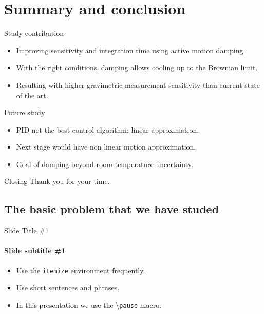 \documentclass{beamer}
\begin{document}
\section{Summary and conclusion}


\begin{frame}{Study contribution}
	\begin{itemize}
		\item Improving sensitivity and integration time using active motion damping.
		\item With the right conditions, damping allows cooling up to the Brownian limit. 
		\item Resulting with higher gravimetric measurement sensitivity than current state of the art.
		
	\end{itemize}
\end{frame}

\begin{frame}{Future study}
	\begin{itemize}
		
		\item PID not the best control algorithm; linear approximation. 
		\item Next stage would have non linear motion approximation.
		\item Goal of damping beyond room temperature uncertainty. 
	\end{itemize}
\end{frame}

\begin{frame}{Closing}
	\centering
	Thank you for your time. \\[12pt]
	
\end{frame}

\iffalse

\subsection[Basic Problem]{The basic problem that we have studed}

\begin{frame}{Slide Title \#1}
	\framesubtitle{Slide subtitle \#1}
	\begin{itemize}
		\item Use the \texttt{itemize} environment frequently.
		\pause
		\item Use short sentences and phrases.
		\pause
		\item In this presentation we use the \textbackslash{}\texttt{pause} macro.
	\end{itemize}
\end{frame}
\end{document}

